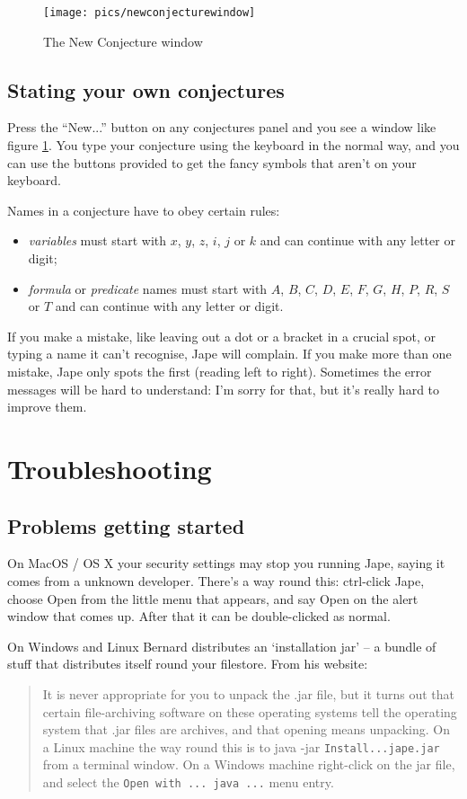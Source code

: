 \documentclass[11pt]{book}
\newcommand{\figref}[1]{figure \ref{fig:#1}}
\begin{document}
\begin{figure}
\centering
\texttt{[image: pics/newconjecturewindow]}
\caption{The New Conjecture window}
\label{fig:newconjecturewindow}
\end{figure}

\section{Stating your own conjectures}

Press the ``New...'' button on any conjectures panel and you see a window like \figref{newconjecturewindow}. You type your conjecture using the keyboard in the normal way, and you can use the buttons provided to get the fancy symbols that aren't on your keyboard.

Names in a conjecture have to obey certain rules:
\begin{itemize}
\item \emph{variables} must start with $x$, $y$, $z$, $i$, $j$ or $k$ and can continue with any letter or digit;
\item \emph{formula} or \emph{predicate} names must start with $A$, $B$, $C$, $D$, $E$, $F$, $G$, $H$, $P$, $R$, $S$ or $T$ and can continue with any letter or digit.
\end{itemize}

If you make a mistake, like leaving out a dot or a bracket in a crucial spot, or typing a name it can't recognise, Jape will complain. If you make more than one mistake, Jape only spots the first (reading left to right). Sometimes the error messages will be hard to understand: I'm sorry for that, but it's really hard to improve them. 

\chapter{Troubleshooting}

\section{Problems getting started}

On MacOS / OS X your security settings may stop you running Jape, saying it comes from a unknown developer. There's a way round this: ctrl-click Jape, choose Open from the little menu that appears, and say Open on the alert window that comes up. After that it can be double-clicked as normal.

On Windows and Linux Bernard distributes an `installation jar' -- a bundle of stuff that distributes itself round your filestore. From his website:
\begin{quote}
It is never appropriate for you to unpack the .jar file, but it turns out that certain file-archiving software on these operating systems tell the operating system that .jar files are archives, and that opening means unpacking. On a Linux machine the way round this is to java -jar \texttt{Install...jape.jar} from a terminal window. On a Windows machine right-click on the jar file, and select the \texttt{Open with ... java ...} menu entry.
\end{quote}
\end{document}
